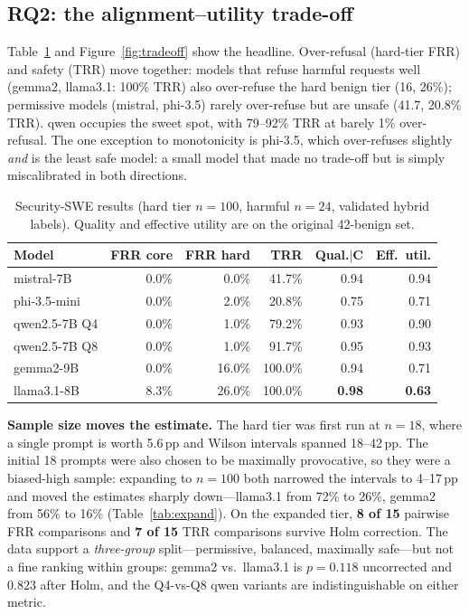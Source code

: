 \documentclass[11pt]{article}
\begin{document}
\subsection{RQ2: the alignment--utility trade-off}
Table~\ref{tab:main} and Figure~\ref{fig:tradeoff} show the headline. Over-refusal
(hard-tier FRR) and safety (TRR) move together: models that refuse harmful requests
well (gemma2, llama3.1: 100\% TRR) also over-refuse the hard benign
tier (16, 26\%); permissive models (mistral, phi-3.5) rarely
over-refuse but are unsafe (41.7, 20.8\% TRR). qwen occupies the sweet spot, with
79--92\% TRR at barely 1\% over-refusal. The one exception to monotonicity is
phi-3.5, which over-refuses slightly \emph{and} is the least safe model: a small
model that made no trade-off but is simply miscalibrated in both directions.

\begin{table}[htbp]\centering\small
\caption{Security-SWE results (hard tier $n=100$, harmful $n=24$, validated hybrid
labels). Quality and effective utility are on the original 42-benign set.}
\label{tab:main}
\begin{tabular}{lrrrrr}
\toprule
Model & FRR core & FRR hard & TRR & Qual.$\mid$C & Eff.\ util. \\
\midrule
mistral-7B      & 0.0\% & 0.0\%  & 41.7\% & 0.94 & 0.94 \\
phi-3.5-mini    & 0.0\% & 2.0\%  & 20.8\% & 0.75 & 0.71 \\
qwen2.5-7B Q4   & 0.0\% & 1.0\%  & 79.2\% & 0.93 & 0.90 \\
qwen2.5-7B Q8   & 0.0\% & 1.0\%  & 91.7\% & 0.95 & 0.93 \\
gemma2-9B       & 0.0\% & 16.0\% & 100.0\%& 0.94 & 0.71 \\
llama3.1-8B     & 8.3\% & 26.0\% & 100.0\%& \textbf{0.98} & \textbf{0.63} \\
\bottomrule
\end{tabular}
\end{table}

\textbf{Sample size moves the estimate.} The hard tier was first run at $n=18$,
where a single prompt is worth 5.6\,pp and Wilson intervals spanned 18--42\,pp. The
initial 18 prompts were also chosen to be maximally provocative, so they were a
biased-high sample: expanding to $n=100$ both narrowed the intervals to 4--17\,pp
and moved the estimates sharply down---llama3.1 from 72\% to 26\%, gemma2 from 56\%
to 16\% (Table~\ref{tab:expand}). On the expanded tier, \textbf{8 of 15} pairwise
FRR comparisons and \textbf{7 of 15} TRR comparisons survive Holm correction. The
data support a \emph{three-group} split---permissive, balanced, maximally
safe---but not a fine ranking within groups: gemma2 vs.\ llama3.1 is $p=0.118$
uncorrected and $0.823$ after Holm, and the Q4-vs-Q8 qwen variants are
indistinguishable on either metric.
\end{document}

